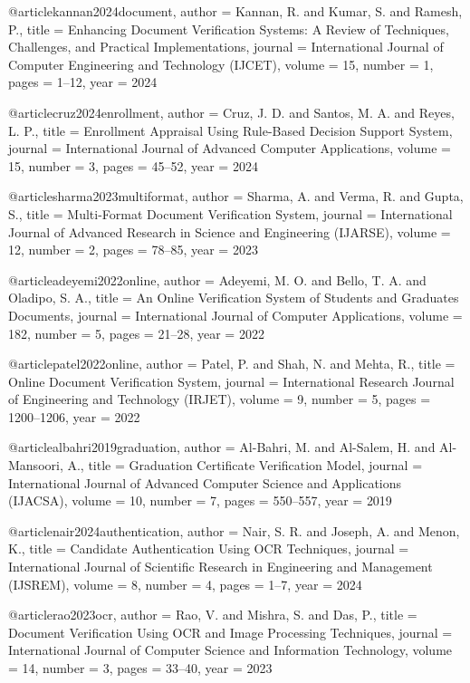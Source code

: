 @article{kannan2024document,
  author = {Kannan, R. and Kumar, S. and Ramesh, P.},
  title = {Enhancing Document Verification Systems: A Review of Techniques, Challenges, and Practical Implementations},
  journal = {International Journal of Computer Engineering and Technology (IJCET)},
  volume = {15},
  number = {1},
  pages = {1--12},
  year = {2024}
}

@article{cruz2024enrollment,
  author = {Cruz, J. D. and Santos, M. A. and Reyes, L. P.},
  title = {Enrollment Appraisal Using Rule-Based Decision Support System},
  journal = {International Journal of Advanced Computer Applications},
  volume = {15},
  number = {3},
  pages = {45--52},
  year = {2024}
}

@article{sharma2023multiformat,
  author = {Sharma, A. and Verma, R. and Gupta, S.},
  title = {Multi-Format Document Verification System},
  journal = {International Journal of Advanced Research in Science and Engineering (IJARSE)},
  volume = {12},
  number = {2},
  pages = {78--85},
  year = {2023}
}

@article{adeyemi2022online,
  author = {Adeyemi, M. O. and Bello, T. A. and Oladipo, S. A.},
  title = {An Online Verification System of Students and Graduates Documents},
  journal = {International Journal of Computer Applications},
  volume = {182},
  number = {5},
  pages = {21--28},
  year = {2022}
}

@article{patel2022online,
  author = {Patel, P. and Shah, N. and Mehta, R.},
  title = {Online Document Verification System},
  journal = {International Research Journal of Engineering and Technology (IRJET)},
  volume = {9},
  number = {5},
  pages = {1200--1206},
  year = {2022}
}

@article{albahri2019graduation,
  author = {Al-Bahri, M. and Al-Salem, H. and Al-Mansoori, A.},
  title = {Graduation Certificate Verification Model},
  journal = {International Journal of Advanced Computer Science and Applications (IJACSA)},
  volume = {10},
  number = {7},
  pages = {550--557},
  year = {2019}
}

@article{nair2024authentication,
  author = {Nair, S. R. and Joseph, A. and Menon, K.},
  title = {Candidate Authentication Using OCR Techniques},
  journal = {International Journal of Scientific Research in Engineering and Management (IJSREM)},
  volume = {8},
  number = {4},
  pages = {1--7},
  year = {2024}
}

@article{rao2023ocr,
  author = {Rao, V. and Mishra, S. and Das, P.},
  title = {Document Verification Using OCR and Image Processing Techniques},
  journal = {International Journal of Computer Science and Information Technology},
  volume = {14},
  number = {3},
  pages = {33--40},
  year = {2023}
}

